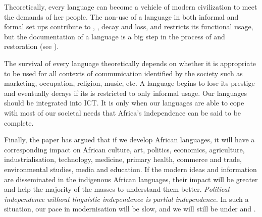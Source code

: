 \documentclass[output=paper,
modfonts
]{langscibook}
\begin{document}
Theoretically, every language can become a vehicle of modern civilization to meet the demands of her people. The non-use of a language in both informal and formal set ups contribute to , , decay and loss, and restricts its functional usage, but the documentation of a language is a big step in the process of  and restoration (see \citealt[256]{Derhemi2002a}). 

The survival of every language theoretically depends on whether it is appropriate to be used for all contexts of communication identified by the society such as marketing, occupation, religion, music, etc. A language begins to lose its prestige and eventually decays if its  is restricted to only informal usage. Our languages should be integrated into ICT. It is only when our languages are able to cope with most of our societal needs that Africa’s independence can be said to be complete. 

Finally, the paper has argued that if we develop African languages, it will have a corresponding impact on African culture, art, politics, economics, agriculture, industrialisation, technology, medicine, primary health, commerce and trade, environmental studies, media and education. If the modern ideas and information are disseminated in the indigenous African languages, their impact will be greater and help the majority of the masses to understand them better. \textit{Political independence without linguistic independence is partial independence.} In such a situation, our pace in modernisation will be slow, and we will still be under  and  \citep{Agyekum2003}.

 
{\sloppy
\printbibliography[heading=subbibliography,notkeyword=this]
}
\end{document}
